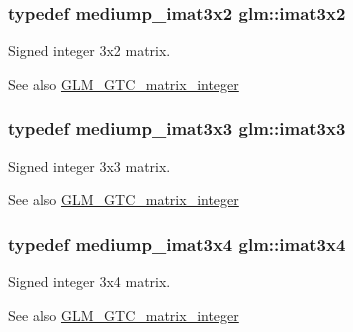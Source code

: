 \subsubsection[{imat3x2}]{\setlength{\rightskip}{0pt plus 5cm}typedef mediump\+\_\+imat3x2 {\bf glm\+::imat3x2}}\label{group__gtc__matrix__integer_ga04deef94cdfdd3b3b2706e10a32ef7f3}
Signed integer 3x2 matrix. \begin{DoxySeeAlso}{See also}
\hyperlink{group__gtc__matrix__integer}{G\+L\+M\+\_\+\+G\+T\+C\+\_\+matrix\+\_\+integer} 
\end{DoxySeeAlso}
\hypertarget{group__gtc__matrix__integer_gaeff9ef8f56cccc828d6b897923e75402}{}
\subsubsection[{imat3x3}]{\setlength{\rightskip}{0pt plus 5cm}typedef mediump\+\_\+imat3x3 {\bf glm\+::imat3x3}}\label{group__gtc__matrix__integer_gaeff9ef8f56cccc828d6b897923e75402}
Signed integer 3x3 matrix. \begin{DoxySeeAlso}{See also}
\hyperlink{group__gtc__matrix__integer}{G\+L\+M\+\_\+\+G\+T\+C\+\_\+matrix\+\_\+integer} 
\end{DoxySeeAlso}
\hypertarget{group__gtc__matrix__integer_gaee5507e6cbbdd05841a0c174e60dd036}{}
\subsubsection[{imat3x4}]{\setlength{\rightskip}{0pt plus 5cm}typedef mediump\+\_\+imat3x4 {\bf glm\+::imat3x4}}\label{group__gtc__matrix__integer_gaee5507e6cbbdd05841a0c174e60dd036}
Signed integer 3x4 matrix. \begin{DoxySeeAlso}{See also}
\hyperlink{group__gtc__matrix__integer}{G\+L\+M\+\_\+\+G\+T\+C\+\_\+matrix\+\_\+integer} 
\end{DoxySeeAlso}
\hypertarget{group__gtc__matrix__integer_ga40fc5c5e0b07543497aa1c314891544a}{}
